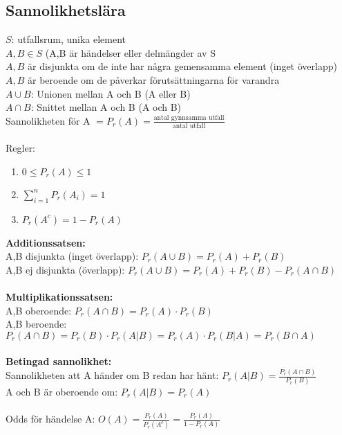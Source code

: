 \documentclass[a4paper,10pt]{article}
\begin{document}
\subsection*{Sannolikhetslära}
$S$: utfallsrum, unika element \\
$A,B \in S$ (A,B är händelser eller delmängder av S \\
$A,B$ är disjunkta om de inte har några gemensamma element (inget överlapp) \\
$A,B$ är beroende om de påverkar förutsättningarna för varandra \\
$A \cup B$: Unionen mellan A och B (A eller B) \\
$A \cap B$: Snittet mellan A och B (A och B) \\
Sannolikheten för A $= P_r(A) = \frac{\text{antal gynnsamma utfall}}{\text{antal utfall}}$ \\
 \\
Regler:
\begin{enumerate}
  \item{$0 \leq P_r(A) \leq 1$}
  \item{$\sum_{i=1}^n P_r(A_i) = 1$}
  \item{$P_r(A^c) = 1 - P_r(A)$}
\end{enumerate}
{\bf Additionssatsen:} \\
A,B disjunkta (inget överlapp): $P_r(A \cup B) = P_r(A) + P_r(B)$ \\
A,B ej disjunkta (överlapp): $P_r(A \cup B) = P_r(A) + P_r(B) - P_r(A \cap B)$ \\
 \vspace{1mm} \\
{\bf Multiplikationssatsen:} \\
A,B oberoende: $P_r(A \cap B) = P_r(A) \cdot P_r(B)$ \\
A,B beroende: $P_r(A \cap B) = P_r(B) \cdot P_r(A|B) = P_r(A) \cdot P_r(B|A) = P_r(B \cap A)$ \\
 \vspace{1mm} \\
{\bf Betingad sannolikhet:} \\
Sannolikheten att A händer om B redan har hänt: $P_r(A|B) = \frac{P_r(A \cap B)}{P_r(B)}$ \\
A och B är oberoende om: $P_r(A|B) = P_r(A)$ \\
\vspace{1mm} \\
Odds för händelse A: $O(A) = \frac{P_r(A)}{P_r(A^c)} = \frac{P_r(A)}{1-P_r(A)}$
\vspace{1cm} \\
\end{document}
